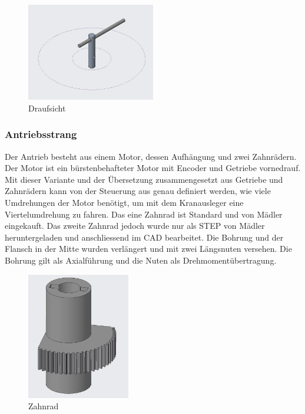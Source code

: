 \documentclass[../../main.tex]{subfiles}
\begin{document}
        \begin{figure}[H]
            \centering
            \includegraphics[width=0.5\textwidth]{../../images/Kran/Top.JPG}
            \caption {Draufsicht}
            \label{fig:et_komponenten}
        \end{figure}



    \subsubsection{Antriebsstrang}
        Der Antrieb besteht aus einem Motor, dessen Aufhängung und zwei Zahnrädern. Der Motor ist ein bürstenbehafteter Motor mit Encoder und Getriebe vornedrauf. Mit dieser Variante und der Übersetzung zusammengesetzt aus Getriebe und Zahnrädern kann von der Steuerung aus genau definiert werden, wie viele Umdrehungen der Motor benötigt, um mit dem Kranausleger eine Viertelumdrehung zu fahren. Das eine Zahnrad ist Standard und von Mädler eingekauft. Das zweite Zahnrad jedoch wurde nur als STEP von Mädler heruntergeladen und anschliessend im CAD bearbeitet. Die Bohrung und der Flansch in der Mitte wurden verlängert und mit zwei Längsnuten versehen. Die Bohrung gilt als Axialführung und die Nuten als Drehmomentübertragung.

        \begin{figure}[H]
            \centering
            \includegraphics[width=0.4\textwidth]{../../images/Kran/Zahnrad.JPG}
            \caption {Zahnrad}
            \label{fig:et_komponenten}
        \end{figure}
\end{document}
